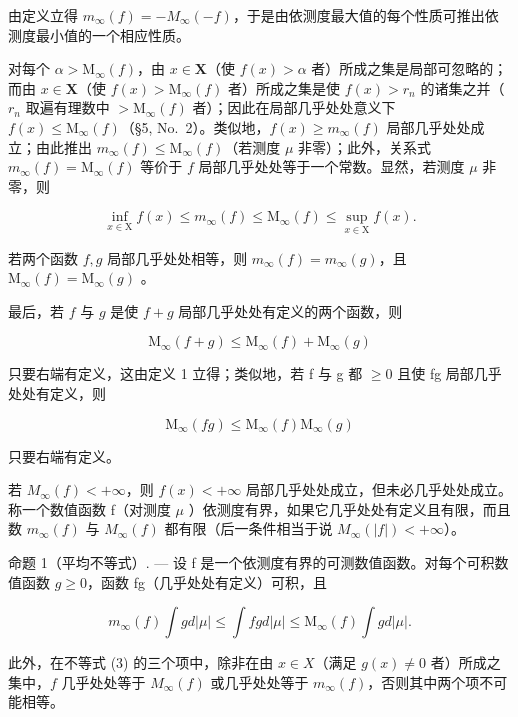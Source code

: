 由定义立得 \(m_{\infty}(f) = -M_{\infty}(-f)\)，于是由依测度最大值的每个性质可推出依测度最小值的一个相应性质。

对每个 \(\alpha > \mathrm{M}_{\infty}(f)\)，由 \(x \in \mathbf{X}\)（使 \(f(x) > \alpha\) 者）所成之集是局部可忽略的；而由 \(x \in \mathbf{X}\)（使 \(f(x) > \mathrm{M}_{\infty}(f)\) 者）所成之集是使 \(f(x) > r_n\) 的诸集之并（\(r_n\) 取遍有理数中 \(> \mathrm{M}_{\infty}(f)\) 者）；因此在局部几乎处处意义下 \(f(x) \leqslant \mathrm{M}_{\infty}(f)\)（§5, No.~2）。类似地，\(f(x) \geqslant m_{\infty}(f)\) 局部几乎处处成立；由此推出 \(m_{\infty}(f) \leqslant \mathrm{M}_{\infty}(f)\)（若测度 \(\mu\) 非零）；此外，关系式 \(m_{\infty}(f) = \mathrm{M}_{\infty}(f)\) 等价于 \(f\) 局部几乎处处等于一个常数。显然，若测度 \(\mu\) 非零，则

\[
\inf _ {x \in \mathrm{X}} f (x) \leqslant m _ {\infty} (f) \leqslant \mathrm{M} _ {\infty} (f) \leqslant \sup _ {x \in \mathrm{X}} f (x).
\]

若两个函数 \(f, g\) 局部几乎处处相等，则 \(m_{\infty}(f) = m_{\infty}(g)\)，且 \(\mathrm{M}_{\infty}(f) = \mathrm{M}_{\infty}(g)\) 。

最后，若 \(f\) 与 \(g\) 是使 \(f + g\) 局部几乎处处有定义的两个函数，则

\[
\mathrm{M} _ {\infty} (f + g) \leqslant \mathrm{M} _ {\infty} (f) + \mathrm{M} _ {\infty} (g)\tag{1}
\]

只要右端有定义，这由定义 1 立得；类似地，若 f 与 g 都 \(\geqslant0\) 且使 fg 局部几乎处处有定义，则

\[
\mathrm{M} _ {\infty} (f g) \leqslant \mathrm{M} _ {\infty} (f) \mathrm{M} _ {\infty} (g)\tag{2}
\]

只要右端有定义。

若 \(M_{\infty}(f) < +\infty\)，则 \(f(x) < +\infty\) 局部几乎处处成立，但未必几乎处处成立。称一个数值函数 f（对测度 \(\mu\) ）依测度有界，如果它几乎处处有定义且有限，而且数 \(m_{\infty}(f)\) 与 \(M_{\infty}(f)\) 都有限（后一条件相当于说 \(M_{\infty}(|f|)<+\infty\)）。

命题 1（平均不等式）. --- 设 f 是一个依测度有界的可测数值函数。对每个可积数值函数 \(g \geqslant 0\)，函数 fg（几乎处处有定义）可积，且

\[
m _ {\infty} (f) \int g d | \mu | \leqslant \int f g d | \mu | \leqslant \mathrm{M} _ {\infty} (f) \int g d | \mu |.\tag{3}
\]

此外，在不等式 (3) 的三个项中，除非在由 \(x \in X\)（满足 \(g(x) \neq 0\) 者）所成之集中，\(f\) 几乎处处等于 \(M_{\infty}(f)\) 或几乎处处等于 \(m_{\infty}(f)\)，否则其中两个项不可能相等。

